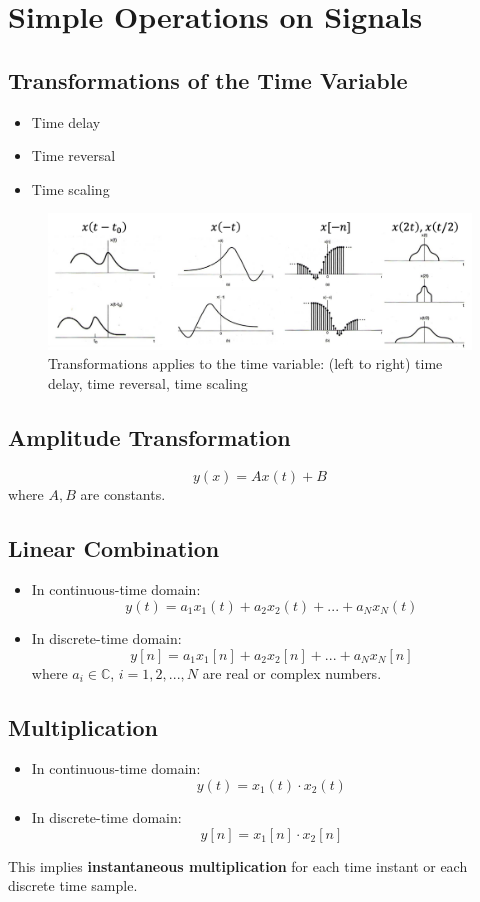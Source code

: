 \section{Simple Operations on Signals}
 \subsection{Transformations of the Time Variable}
 \begin{itemize}
 \item Time delay
 \item Time reversal 
 \item Time scaling
 \end{itemize}
\begin{figure}[H]\centering \includegraphics[width=\textwidth]{images/timetransformation}
  \caption{Transformations applies to the time variable: (left to right) time delay, time reversal, time scaling} \end{figure}
  \subsection{Amplitude Transformation}
  \[ y(x) = Ax(t)+B \]
  \quad where $A,B$ are constants.
\subsection{Linear Combination}
\begin{itemize}
\item In continuous-time domain:
\[ y(t) = a_{1}x_{1}(t)+a_{2}x_{2}(t)+...+a_{N}x_{N}(t) \]
\item In discrete-time domain:
\[ y[n] = a_{1}x_{1}[n]+a_{2}x_{2}[n]+...+a_{N}x_{N}[n] \]
 \quad where $a_{i} \in \mathbb{C}$, $i=1,2,...,N$ are real or complex numbers.
\end{itemize}
\subsection{Multiplication} 
\begin{itemize}
\item In continuous-time domain: 
\[ y(t) = x_{1}(t) \cdot x_{2}(t) \]
\item In discrete-time domain:
\[ y[n] = x_{1}[n] \cdot x_{2}[n] \]
\end{itemize}
This implies \textbf{instantaneous multiplication} for each time instant or each discrete time sample.
